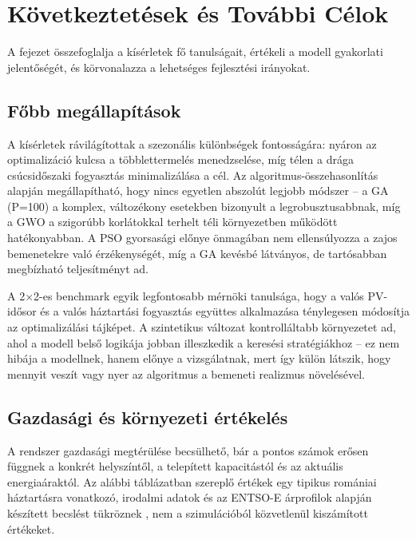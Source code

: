 \chapter{Következtetések és További Célok}\label{ch:KOVETK}

\begin{osszefoglal}
A fejezet összefoglalja a kísérletek fő tanulságait, értékeli a modell gyakorlati jelentőségét, és körvonalazza a lehetséges fejlesztési irányokat.
\end{osszefoglal}

\section{Főbb megállapítások}

A kísérletek rávilágítottak a szezonális különbségek fontosságára: nyáron az optimalizáció kulcsa a többlettermelés menedzselése, míg télen a drága csúcsidőszaki fogyasztás minimalizálása a cél. Az algoritmus-összehasonlítás alapján megállapítható, hogy nincs egyetlen abszolút legjobb módszer -- a GA (P=100) a komplex, változékony esetekben bizonyult a legrobusztusabbnak, míg a GWO a szigorúbb korlátokkal terhelt téli környezetben működött hatékonyabban. A PSO gyorsasági előnye önmagában nem ellensúlyozza a zajos bemenetekre való érzékenységét, míg a GA kevésbé látványos, de tartósabban megbízható teljesítményt ad.

A 2×2-es benchmark egyik legfontosabb mérnöki tanulsága, hogy a valós PV-idősor és a valós háztartási fogyasztás együttes alkalmazása ténylegesen módosítja az optimalizálási tájképet. A szintetikus változat kontrolláltabb környezetet ad, ahol a modell belső logikája jobban illeszkedik a keresési stratégiákhoz -- ez nem hibája a modellnek, hanem előnye a vizsgálatnak, mert így külön látszik, hogy mennyit veszít vagy nyer az algoritmus a bemeneti realizmus növelésével.

\section{Gazdasági és környezeti értékelés}

A rendszer gazdasági megtérülése becsülhető, bár a pontos számok erősen függnek a konkrét helyszíntől, a telepített kapacitástól és az aktuális energiaáraktól. Az alábbi táblázatban szereplő értékek egy tipikus romániai háztartásra vonatkozó, irodalmi adatok és az ENTSO-E árprofilok alapján készített becslést tükröznek \cite{Fadaee2012}, nem a szimulációból közvetlenül kiszámított értékeket.

